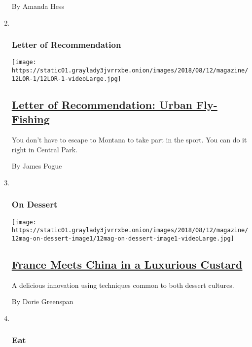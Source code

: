 \begin{enumerate}
  By Amanda Hess
\item ~
  \hypertarget{letter-of-recommendation}{%
  \subsubsection{Letter of
  Recommendation}\label{letter-of-recommendation}}

  \texttt{[image: https://static01.graylady3jvrrxbe.onion/images/2018/08/12/magazine/12LOR-1/12LOR-1-videoLarge.jpg]}

  \hypertarget{letter-of-recommendation-urban-fly-fishing}{%
  \subsection{\texorpdfstring{\href{/2018/08/08/magazine/letter-of-recommendation-urban-fly-fishing.html}{Letter
  of Recommendation: Urban
  Fly-Fishing}}{Letter of Recommendation: Urban Fly-Fishing}}\label{letter-of-recommendation-urban-fly-fishing}}

  You don't have to escape to Montana to take part in the sport. You can
  do it right in Central Park.

  By James Pogue
\item ~
  \hypertarget{on-dessert}{%
  \subsubsection{On Dessert}\label{on-dessert}}

  \texttt{[image: https://static01.graylady3jvrrxbe.onion/images/2018/08/12/magazine/12mag-on-dessert-image1/12mag-on-dessert-image1-videoLarge.jpg]}

  \hypertarget{france-meets-china-in-a-luxurious-custard}{%
  \subsection{\texorpdfstring{\href{/2018/08/08/magazine/french-pastry-techniques-custard.html}{France
  Meets China in a Luxurious
  Custard}}{France Meets China in a Luxurious Custard}}\label{france-meets-china-in-a-luxurious-custard}}

  A delicious innovation using techniques common to both dessert
  cultures.

  By Dorie Greenspan
\item ~
  \hypertarget{eat}{%
  \subsubsection{Eat}\label{eat}}


\end{enumerate}

